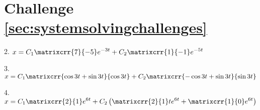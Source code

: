 \section{Challenge \ref{sec:systemsolvingchallenges}}
\label{sec:systemsolvingsols}

2. $\displaystyle x = C_1 \matrixcrr{7}{-5} e^{-3t} + C_2 \matrixcrr{1}{-1} e^{-5t}$

3. $\displaystyle x = C_1 \matrixcrr{\cos 3t + \sin 3t}{\cos 3t} + C_2 \matrixcrr{- \cos 3t + \sin 3t}{\sin 3t}$

4. $\displaystyle x = C_1 \matrixcrr{2}{1} e^{6t} + C_2 \left( \matrixcrr{2}{1} t e^{6t} + \matrixcrr{1}{0} e^{6t} \right)$
